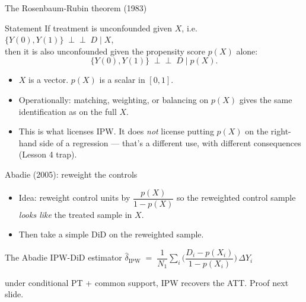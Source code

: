 \documentclass[aspectratio=169,11pt]{beamer}
\begin{document}
\begin{frame}{The Rosenbaum-Rubin theorem (1983)}
\vspace{0.3em}
\begin{block}{Statement}
If treatment is unconfounded given $X$, i.e. \;\;$\{Y(0), Y(1)\} \;\perp\!\!\!\perp\; D \mid X$, \\
then it is also unconfounded given the propensity score $p(X)$ alone:
\vspace{-0.2em}
\[
\{Y(0), Y(1)\} \;\perp\!\!\!\perp\; D \;\big|\; p(X).
\]
\end{block}
\vspace{0.3em}
\begin{itemize}\small
  \item $X$ is a vector. $p(X)$ is a scalar in $[0,1]$. \;
  \item Operationally: matching, weighting, or balancing on $p(X)$ gives the same identification as on the full $X$.
  \item This is what licenses IPW. It does \textit{not} license putting $p(X)$ on the right-hand side of a regression --- that's a different use, with different consequences (Lesson 4 trap).
\end{itemize}
\end{frame}

\begin{frame}{Abadie (2005): reweight the controls}
\vspace{0.5em}
\begin{itemize}
  \item Idea: reweight control units by $\dfrac{p(X)}{1-p(X)}$ so the reweighted control sample \textit{looks like} the treated sample in $X$.
  \item Then take a simple DiD on the reweighted sample.
\end{itemize}
\vspace{0.5em}
\begin{block}{The Abadie IPW-DiD estimator}
\small
\centering
$\widehat{\delta}_{\text{IPW}} \;=\; \dfrac{1}{N_1}\displaystyle\sum_i \bigg(\dfrac{D_i - p(X_i)}{1 - p(X_i)}\bigg)\, \Delta Y_i$
\end{block}
\vspace{0.1em}
 under conditional PT + common support, IPW recovers the ATT. \;\;Proof next slide.
\end{frame}
\end{document}

